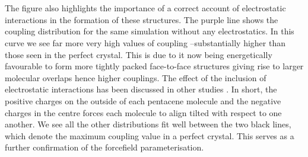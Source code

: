 \\\\
The figure also highlights the importance of a correct account of electrostatic interactions in the formation of these structures. The purple line shows the coupling distribution for the same simulation without any electrostatics. In this curve we see far more very high values of coupling --substantially higher than those seen in the perfect crystal. This is due to it now being energetically favourable to form  more tightly packed face-to-face structures giving rise to larger molecular overlaps hence higher couplings. The effect of the inclusion of electrostatic interactions has been discussed in other studies \cite{C7CE01700F, Ryno2014, Kafer2008}. In short, the positive charges on the outside of each pentacene molecule and the negative charges in the centre forces each molecule to align tilted with respect to one another. We see all the other distributions fit well between the two black lines, which denote the maximum coupling value in a perfect crystal. This serves as a further confirmation of the forcefield parameterisation.
